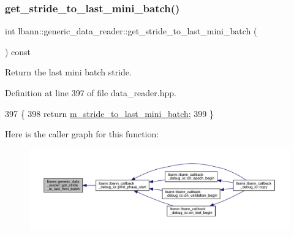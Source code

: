 \subsubsection{\texorpdfstring{get\+\_\+stride\+\_\+to\+\_\+last\+\_\+mini\+\_\+batch()}{get\_stride\_to\_last\_mini\_batch()}}
{\footnotesize\ttfamily int lbann\+::generic\+\_\+data\+\_\+reader\+::get\+\_\+stride\+\_\+to\+\_\+last\+\_\+mini\+\_\+batch (\begin{DoxyParamCaption}{ }\end{DoxyParamCaption}) const\hspace{0.3cm}{\ttfamily [inline]}}



Return the last mini batch stride. 



Definition at line 397 of file data\+\_\+reader.\+hpp.


\begin{DoxyCode}
397                                             \{
398     \textcolor{keywordflow}{return} \hyperlink{classlbann_1_1generic__data__reader_ac46922f2ef4f392bcc7c59c21685a3ff}{m\_stride\_to\_last\_mini\_batch};
399   \}
\end{DoxyCode}
Here is the caller graph for this function\+:\nopagebreak
\begin{figure}[H]
\begin{center}
\leavevmode
\includegraphics[width=350pt]{classlbann_1_1generic__data__reader_a722a28971b6799566dc21ba552a4cde6_icgraph}
\end{center}
\end{figure}
\mbox{\label{classlbann_1_1generic__data__reader_a2d1d5657e8b9bf8b8a9d51b33aedf017}} 
